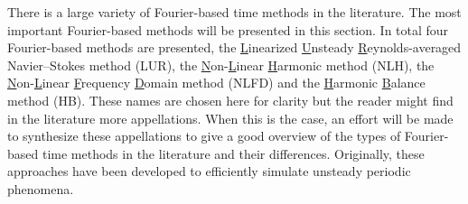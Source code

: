 

There is a large variety of Fourier-based time methods in the
literature. 
The most important Fourier-based methods will be presented in this section.
In total four Fourier-based methods are presented, 
the \underline{L}inearized \underline{U}nsteady 
\underline{R}eynolds-averaged
Navier--Stokes method (LUR), 
the \underline{N}on-\underline{L}inear 
\underline{H}armonic method (NLH), the \underline{N}on-\underline{L}inear 
\underline{F}requency \underline{D}omain
method (NLFD) and the \underline{H}armonic \underline{B}alance 
method (HB).
These names are chosen here
for clarity but the reader might find in the literature more
appellations. When this is the case, an effort will be made to synthesize
these appellations to give a good 
overview of the types of Fourier-based time methods in the literature
and their differences. Originally, these approaches have been developed
to efficiently simulate unsteady periodic phenomena.

